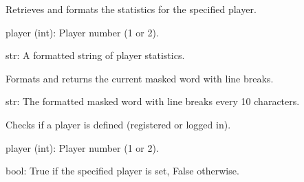 \documentclass[letterpaper,10pt,english]{sphinxmanual}
\begin{document}
\begin{fulllineitems}
\label{\detokenize{modules:Game_Logic.get_statistics}}
\pysigstartsignatures
{}
\pysigstopsignatures
\sphinxAtStartPar
Retrieves and formats the statistics for the specified player.
\begin{description}
\sphinxAtStartPar
player (int): Player number (1 or 2).

\sphinxAtStartPar
str: A formatted string of player statistics.

\end{description}

\end{fulllineitems}


\begin{fulllineitems}
\label{\detokenize{modules:Game_Logic.get_word}}
\pysigstartsignatures
{}
\pysigstopsignatures
\sphinxAtStartPar
Formats and returns the current masked word with line breaks.
\begin{description}
\sphinxAtStartPar
str: The formatted masked word with line breaks every 10 characters.

\end{description}

\end{fulllineitems}


\begin{fulllineitems}
\label{\detokenize{modules:Game_Logic.is_player_defined}}
\pysigstartsignatures
{}
\pysigstopsignatures
\sphinxAtStartPar
Checks if a player is defined (registered or logged in).
\begin{description}
\sphinxAtStartPar
player (int): Player number (1 or 2).

\sphinxAtStartPar
bool: True if the specified player is set, False otherwise.

\end{description}

\end{fulllineitems}
\end{document}
